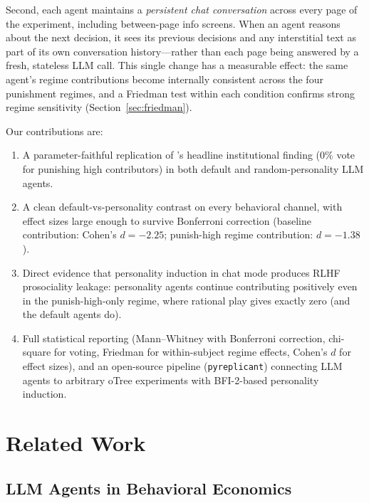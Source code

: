 \documentclass[12pt, a4paper]{article}
\begin{document}
Second, each agent maintains a \emph{persistent chat conversation} across every page of the experiment, including between-page info screens. When an agent reasons about the next decision, it sees its previous decisions and any interstitial text as part of its own conversation history---rather than each page being answered by a fresh, stateless LLM call. This single change has a measurable effect: the same agent's regime contributions become internally consistent across the four punishment regimes, and a Friedman test within each condition confirms strong regime sensitivity (Section~\ref{sec:friedman}).

Our contributions are:

\begin{enumerate}
  \item A parameter-faithful replication of \citet{ertan2009who}'s headline institutional finding ($0\%$ vote for punishing high contributors) in both default and random-personality LLM agents.
  \item A clean default-vs-personality contrast on every behavioral channel, with effect sizes large enough to survive Bonferroni correction (baseline contribution: Cohen's $d=-2.25$; punish-high regime contribution: $d=-1.38$).
  \item Direct evidence that personality induction in chat mode produces RLHF prosociality leakage: personality agents continue contributing positively even in the punish-high-only regime, where rational play gives exactly zero (and the default agents do).
  \item Full statistical reporting (Mann--Whitney with Bonferroni correction, chi-square for voting, Friedman for within-subject regime effects, Cohen's $d$ for effect sizes), and an open-source pipeline (\texttt{pyreplicant}) connecting LLM agents to arbitrary oTree experiments with BFI-2-based personality induction.
\end{enumerate}

\section{Related Work}

\subsection{LLM Agents in Behavioral Economics}
\end{document}
